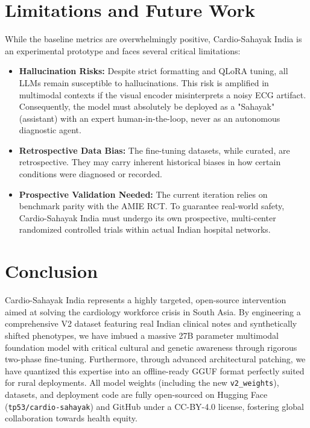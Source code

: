 \documentclass[11pt,a4paper]{article}
\begin{document}
\section{Limitations and Future Work}

While the baseline metrics are overwhelmingly positive, Cardio-Sahayak India is an experimental prototype and faces several critical limitations:
\begin{itemize}
    \item \textbf{Hallucination Risks:} Despite strict formatting and QLoRA tuning, all LLMs remain susceptible to hallucinations. This risk is amplified in multimodal contexts if the visual encoder misinterprets a noisy ECG artifact. Consequently, the model must absolutely be deployed as a "Sahayak" (assistant) with an expert human-in-the-loop, never as an autonomous diagnostic agent.
    \item \textbf{Retrospective Data Bias:} The fine-tuning datasets, while curated, are retrospective. They may carry inherent historical biases in how certain conditions were diagnosed or recorded.
    \item \textbf{Prospective Validation Needed:} The current iteration relies on benchmark parity with the AMIE RCT. To guarantee real-world safety, Cardio-Sahayak India must undergo its own prospective, multi-center randomized controlled trials within actual Indian hospital networks.
\end{itemize}

\section{Conclusion}

Cardio-Sahayak India represents a highly targeted, open-source intervention aimed at solving the cardiology workforce crisis in South Asia. By engineering a comprehensive V2 dataset featuring real Indian clinical notes and synthetically shifted phenotypes, we have imbued a massive 27B parameter multimodal foundation model with critical cultural and genetic awareness through rigorous two-phase fine-tuning. Furthermore, through advanced architectural patching, we have quantized this expertise into an offline-ready GGUF format perfectly suited for rural deployments. All model weights (including the new \texttt{v2\_weights}), datasets, and deployment code are fully open-sourced on Hugging Face (\texttt{tp53/cardio-sahayak}) and GitHub under a CC-BY-4.0 license, fostering global collaboration towards health equity.
\end{document}
